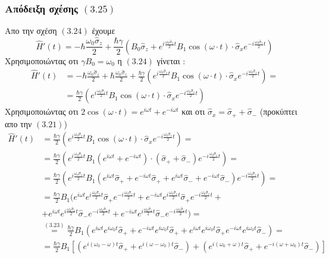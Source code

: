 \documentclass[12pt]{article}
\begin{document}
\subsubsection*{Απόδειξη σχέσης $(3.25)$}
Απο την σχέση $(3.24)$ έχουμε 
$$ \hat{H}'(t) = - \hbar\frac{\omega_0\hat{\sigma}_z}{2} +\frac{\hbar\gamma}{2}\left(B_0 \hat{\sigma}_z +e^{i\frac{\omega_0\hat{\sigma}_z}{2}t}B_1\cos(\omega\cdot t)\cdot\hat{\sigma}_x e^{-i\frac{\omega_0\hat{\sigma}_z}{2}t}\right) $$
Χρησιμοποιώντας οτι $\gamma B_0 = \omega_0$ η $(3.24)$ γίνεται :
\begin{align*}
    \hat{H}'(t) &= - \hbar\frac{\omega_0\hat{\sigma}_z}{2} +\hbar\frac{\omega_0\hat{\sigma}_z}{2}+\frac{\hbar\gamma}{2}\left( e^{i\frac{\omega_0\hat{\sigma}_z}{2}t}B_1\cos(\omega\cdot t)\cdot\hat{\sigma}_x e^{-i\frac{\omega_0\hat{\sigma}_z}{2}t}\right)=\\   
                &=\frac{\hbar\gamma}{2}\left( e^{i\frac{\omega_0\hat{\sigma}_z}{2}t}B_1\cos(\omega\cdot t)\cdot\hat{\sigma}_x e^{-i\frac{\omega_0\hat{\sigma}_z}{2}t}\right)
\end{align*}
Χρησιμοποιώντας οτι $2\cos(\omega \cdot t) = e^{i\omega t} + e^{-i\omega t}$ και οτι $\hat{\sigma}_x = \hat{\sigma}_+ + \hat{\sigma}_-$ (προκύπτει απο την $(3.21)$)
\begin{align*}
    \hat{H}'(t) &=\frac{\hbar\gamma}{2}\left( e^{i\frac{\omega_0\hat{\sigma}_z}{2}t}B_1\cos(\omega\cdot t)\cdot\hat{\sigma}_x e^{-i\frac{\omega_0\hat{\sigma}_z}{2}t}\right) =\\
                &=  \frac{\hbar\gamma}{2}\left( e^{i\frac{\omega_0\hat{\sigma}_z}{2}t}B_1(e^{i\omega t} + e^{-i\omega t})\cdot(\hat{\sigma}_+ + \hat{\sigma}_- )e^{-i\frac{\omega_0\hat{\sigma}_z}{2}t}\right) =\\
                &=  \frac{\hbar\gamma}{2}\left( e^{i\frac{\omega_0\hat{\sigma}_z}{2}t}B_1(e^{i\omega t}\hat{\sigma}_+ + e^{-i\omega t}\hat{\sigma}_+ + e^{i\omega t}\hat{\sigma}_- + e^{-i\omega t}\hat{\sigma}_- )e^{-i\frac{\omega_0\hat{\sigma}_z}{2}t}\right) =\\
                &=  \frac{\hbar\gamma}{2}B_1(e^{i\omega t}e^{i\frac{\omega_0\hat{\sigma}_z}{2}t}\hat{\sigma}_+e^{-i\frac{\omega_0\hat{\sigma}_z}{2}t} + e^{-i\omega t}e^{i\frac{\omega_0\hat{\sigma}_z}{2}t}\hat{\sigma}_+e^{-i\frac{\omega_0\hat{\sigma}_z}{2}t} +\\
                &+ e^{i\omega t}e^{i\frac{\omega_0\hat{\sigma}_z}{2}t}\hat{\sigma}_-e^{-i\frac{\omega_0\hat{\sigma}_z}{2}t} + e^{-i\omega t}e^{i\frac{\omega_0\hat{\sigma}_z}{2}t}\hat{\sigma}_- e^{-i\frac{\omega_0\hat{\sigma}_z}{2}t})=\\
                &\stackrel{(3.23)}{=} \frac{\hbar\gamma}{2}B_1(e^{i\omega t}e^{i\omega_0 t}\hat{\sigma}_+ + e^{-i\omega t}e^{i\omega_0 t}\hat{\sigma}_+ + e^{i\omega t}e^{i\omega_0 t}\hat{\sigma}_ + e^{-i\omega t}e^{i\omega_0 t}\hat{\sigma}_- )=\\
                & = \frac{\hbar\gamma}{2}B_1\left[\left( e^{i(\omega_0 - \omega )t}\hat{\sigma}_+ + e^{i(\omega - \omega_0 )t}\hat{\sigma}_-\right) + \left( e^{i(\omega_0 + \omega )t}\hat{\sigma}_+ + e^{-i(\omega + \omega_0 )t}\hat{\sigma}_-\right) \right]
            \end{align*}
\end{document}

